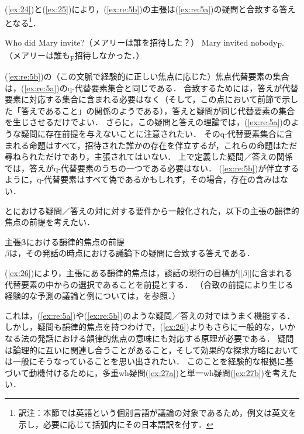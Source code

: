 \documentclass{goken}
\newcommand{\ori}[1]{\noindent\textcolor[gray]{0.7}{\fontsize{8pt}{8pt}\selectfont{\textsf{(p.~#1)}}} }
\begin{document}
\renewcommand{\thefootnote}{\fnsymbol{footnote}}
\setcounter{footnote}{0}
\noindent(\ref{ex:24})と(\ref{ex:25})により，(\ref{ex:re:5b})の主張は(\ref{ex:re:5a})の疑問と合致する答えとなる\footnote{訳注：本節では英語という個別言語が議論の対象であるため，例文は英文を示し，必要に応じて括弧内にその日本語訳を付す．}．
\renewcommand{\thefootnote}{\arabic{footnote}~}
\setcounter{footnote}{20}

\ori{32}
\setcounter{exx}{4}
\begin{exe}
	\ex\label{ex:re:5}
	\begin{xlist}
    \ex\label{ex:re:5a} Who did Mary invite?（メアリーは誰を招待した？）
    \ex\label{ex:re:5b} Mary invited nobody\textsubscript{F}.（メアリーは誰も\textsubscript{F}招待しなかった．）
  \end{xlist}
\end{exe}

\noindent
(\ref{ex:re:5b})の（この文脈で経験的に正しい焦点に応じた）焦点代替要素の集合は，(\ref{ex:re:5a})のq-代替要素集合と同じである．
合致するためには，答えが代替要素に対応する集合に含まれる必要はなく（そして，この点において前節で示した「答えであること」の関係のようである），答えと疑問が同じ代替要素の集合を生じさせるだけでよい．
さらに，この疑問と答えの理論では，(\ref{ex:re:5a})のような疑問に存在前提を与えないことに注意されたい．
そのq-代替要素集合に含まれる命題はすべて，招待された誰かの存在を伴立するが，これらの命題はただ尋ねられただけであり，主張されてはいない．
上で定義した疑問／答えの関係では，答えがq-代替要素のうちの一つである必要はない．
(\ref{ex:re:5b})が伴立するように，q-代替要素はすべて偽であるかもしれず，その場合，存在の含みはない．

\citealt{vonStechow1991}と\citealt{Rooth1992a}における疑問／答えの対に対する要件から一般化された，以下の主張の韻律的焦点の前提を考えたい．

\setcounter{exx}{25}
\begin{exe}
	\ex\label{ex:26} \textsf{主張$\boldsymbol{\beta}$における韻律的焦点の前提}\\
%
	$\beta$は，その発話の時点における議論下の疑問に合致する答えである．
\end{exe}

\noindent
(\ref{ex:26})により，主張にある韻律的焦点は，談話の現行の目標が$||\beta||$に含まれる代替要素の中からの選択であることを前提とする．
（合致の前提により生じる経験的な予測の議論と例については，\citealt[341--343]{Kadmon2001}を参照．）

これは，(\ref{ex:re:5a})や(\ref{ex:re:5b})のような疑問／答えの対ではうまく機能する．
しかし，疑問も韻律的焦点を持つわけで，(\ref{ex:26})よりもさらに一般的な，いかなる法の発話における韻律的焦点の意味にも対応する原理が必要である．
疑問は論理的に互いに関連し合うことがあること，そして効果的な探求方略においては一般にそうなっていることを思い出されたい．
このことを経験的な根拠に基づいて動機付けるために，多重wh疑問(\ref{ex:27a})と単一wh疑問(\ref{ex:27b})を考えたい．
\end{document}
